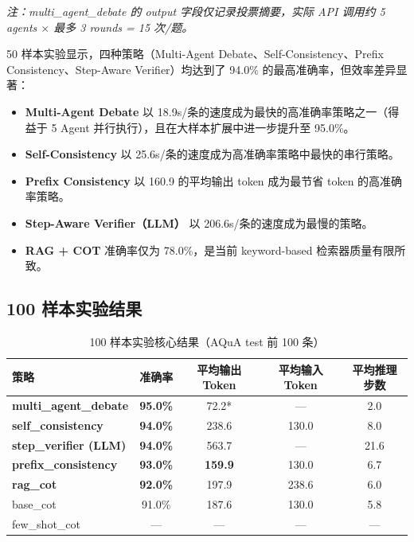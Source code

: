 \documentclass[lang=cn,a4paper,newtx]{elegantpaper}
\begin{document}
\textit{注：multi\_agent\_debate 的 output 字段仅记录投票摘要，实际 API 调用约 5 agents $\times$ 最多 3 rounds = 15 次/题。}

50 样本实验显示，四种策略（Multi-Agent Debate、Self-Consistency、Prefix Consistency、Step-Aware Verifier）均达到了 94.0\% 的最高准确率，但效率差异显著：

\begin{itemize}
  \item \textbf{Multi-Agent Debate} 以 18.9s/条的速度成为最快的高准确率策略之一（得益于 5 Agent 并行执行），且在大样本扩展中进一步提升至 95.0\%。
  \item \textbf{Self-Consistency} 以 25.6s/条的速度成为高准确率策略中最快的串行策略。
  \item \textbf{Prefix Consistency} 以 160.9 的平均输出 token 成为最节省 token 的高准确率策略。
  \item \textbf{Step-Aware Verifier（LLM）} 以 206.6s/条的速度成为最慢的策略。
  \item \textbf{RAG + COT} 准确率仅为 78.0\%，是当前 keyword-based 检索器质量有限所致。
\end{itemize}

\subsection{100 样本实验结果}

\begin{table}[htbp]
\centering
\caption{100 样本实验核心结果（AQuA test 前 100 条）}
\begin{tabular}{lcccc}
\toprule
策略 & 准确率 & 平均输出 Token & 平均输入 Token & 平均推理步数 \\
\midrule
\textbf{multi\_agent\_debate} & \textbf{95.0\%} & 72.2* & --- & 2.0 \\
\textbf{self\_consistency} & \textbf{94.0\%} & 238.6 & 130.0 & 8.0 \\
\textbf{step\_verifier (LLM)} & \textbf{94.0\%} & 563.7 & --- & 21.6 \\
\textbf{prefix\_consistency} & \textbf{93.0\%} & \textbf{159.9} & 130.0 & 6.7 \\
\textbf{rag\_cot} & \textbf{92.0\%} & 197.9 & 238.6 & 6.0 \\
base\_cot & 91.0\% & 187.6 & 130.0 & 5.8 \\
few\_shot\_cot & --- & --- & --- & --- \\
\bottomrule
\end{tabular}
\end{table}
\end{document}
